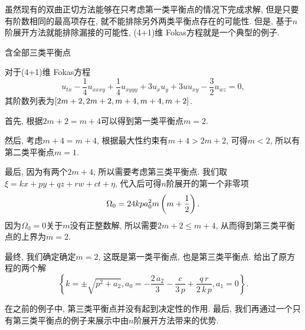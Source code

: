 虽然现有的双曲正切方法能够在只考虑第一类平衡点的情况下完成求解, 但是只要有阶数相同的最高项存在, 就不能排除另外两类平衡点存在的可能性. 但是, 基于$n$阶展开方法就能排除漏接的可能性, (4+1)维 Fokas方程就是一个典型的例子.

\begin{example}含全部三类平衡点

对于(4+1)维 Fokas方程\CITEdaFokas{}
\begin{equation}
    u_{tx}-\frac{1}{4}u_{xxxy}+\frac{1}{4}u_{xyyy}+3u_xu_y+3uu_{xy}-\frac{3}{2}u_{wz}=0 ,
\end{equation}
其阶数列表为$\left[2m+2,2m+2,m+4,m+4,m+2\right]$. 
\begin{compactitem}[\textbullet]
\item 首先, 根据$2m+2=m+4$可以得到第一类平衡点$m=2$.
\item 然后, 考虑$m+4=m+4$, 根据最大性约束有$m+4>2m+2$, 可得$m<2$, 所以有第二类平衡点$m=1$.
\item 最后, 因为有两个$2m+4$, 所以需要考虑第三类平衡点. 我们取$\xi=kx+py+qz+rw+ct+\eta$, 代入后可得$n$阶展开的第一个非零项
\begin{equation}
    \Omega_0 = 24kpa_0^2m\left(m+\frac{1}{2}\right). 
\end{equation}
因为$\Omega_0=0$关于$m$没有正整数解, 所以需要$2m+2\le m+4$, 从而得到第三类平衡点的上界为$m=2$.
\end{compactitem}
   
最终, 我们确定确定$m=2$, 这既是第一类平衡点, 也是第三类平衡点. 给出了原方程的两个解
\begin{equation}
    \left\{ k=\pm \sqrt {{p}^{2}+{{a}_{2}}},{{a}_{0}}=-\frac{2\,{{a}_{2}}}{3}-\frac{c}{3\,p}+ \frac{q\,r}{2\,k\,p},{{a}_{1}}=0\right\} .
\end{equation}
\end{example}

在之前的例子中, 第三类平衡点并没有起到决定性的作用. 最后, 我们再通过一个只有第三类平衡点的例子来展示中由$n$阶展开方法带来的优势.

